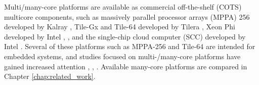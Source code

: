

Multi/many-core platforms are available as commercial off-the-shelf (COTS) multicore components, such as massively parallel processor arrays (MPPA) 256 developed by Kalray \cite{de2013clustered} \cite{de2014time}, Tile-Gx \cite{ramey2011tile} \cite{schooler2010tile} and Tile-64 developed by Tilera \cite{bell2008tile64}, Xeon Phi developed by Intel \cite{chrysos2014intel}, \cite{chrysos2012intel}, and the single-chip cloud computer (SCC) developed by Intel \cite{baron2010single}.
Several of these platforms such as MPPA-256 and Tile-64 are intended for embedded systems, and studies focused on multi-/many-core platforms have gained increased attention \cite{kanter2015kalray}, \cite{denet2017work}, \cite{perret2016predictable}.
Available many-core platforms are compared in Chapter \ref{chap:related_work}.

